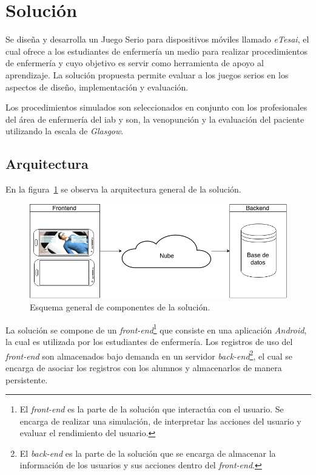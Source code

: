 
\section{Solución}


Se diseña y desarrolla un Juego Serio para dispositivos móviles llamado
\textit{eTesai}, el cual ofrece a los estudiantes de enfermería un medio para
realizar procedimientos de enfermería y cuyo objetivo es servir como herramienta
de apoyo al aprendizaje. La solución propuesta permite evaluar a los juegos
serios en los aspectos de diseño, implementación y evaluación.

Los procedimientos simulados son seleccionados en conjunto con los profesionales
del área de enfermería del \gls{iab} y son, la venopunción
y la evaluación del paciente utilizando la escala de \textit{Glasgow}. 

\subsection{Arquitectura}

En la figura~\ref{fig:full_architecture} se observa la arquitectura general de la 
solución.

\begin{figure}[H]
\centering
\includegraphics[scale=0.29]{images/full.png}
\caption{Esquema general de componentes de la solución.}
\label{fig:full_architecture}
\end{figure}

La solución se compone de un \textit{front-end}\footnote{El \textit{front-end}
    es la parte de la solución que interactúa con el usuario. Se encarga de
    realizar una simulación, de interpretar las acciones del usuario y evaluar
    el rendimiento del usuario.} que consiste en una aplicación \textit{Android}, la cual
es utilizada por los estudiantes de enfermería. Los registros de uso del
\textit{front-end} son almacenados bajo demanda en un servidor
\textit{back-end}\footnote{El \textit{back-end} es la parte de la solución que
    se encarga de almacenar la información de los usuarios y sus acciones dentro
    del \textit{front-end}.}, el cual se encarga de asociar los registros con
los alumnos y almacenarlos de manera persistente.

